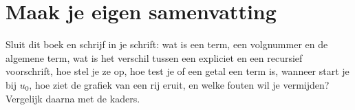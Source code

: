 
\ifzelfstudie
\section*{Maak je eigen samenvatting}
Sluit dit boek en schrijf in je schrift: wat is een term, een volgnummer en de algemene term, wat is het verschil tussen een expliciet en een recursief voorschrift, hoe stel je ze op, hoe test je of een getal een term is, wanneer start je bij $u_0$, hoe ziet de grafiek van een rij eruit, en welke fouten wil je vermijden? Vergelijk daarna met de kaders.
\fi

